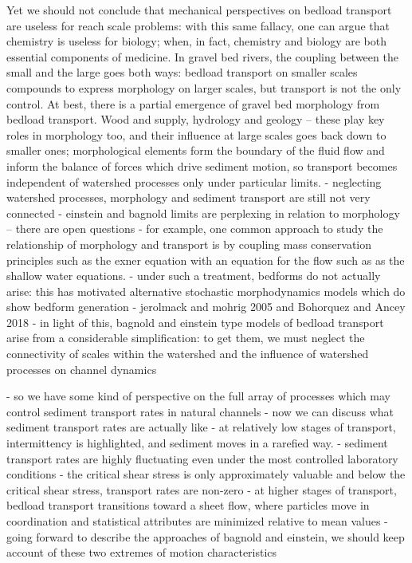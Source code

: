 \documentclass{article}
\begin{document}
{Yet we should not conclude that mechanical perspectives on bedload transport are useless for reach scale problems: with this same fallacy, one can argue that chemistry is useless for biology; when, in fact, chemistry and biology are both essential components of medicine. 
In gravel bed rivers, the coupling between the small and the large goes both ways: bedload transport on smaller scales compounds to express morphology on larger scales, but transport is not the only control. 
At best, there is a partial emergence of gravel bed morphology from bedload transport. 
Wood and supply, hydrology and geology -- these play key roles in morphology too, and their influence at large scales goes back down to smaller ones; morphological elements form the boundary of the fluid flow and inform the balance of forces which drive sediment motion, so transport becomes independent of watershed processes only under particular limits. 
- neglecting watershed processes, morphology and sediment transport are still not very connected 
- einstein and bagnold limits are perplexing in relation to morphology -- there are open questions
- for example, one common approach to study the relationship of morphology and transport is by coupling mass conservation principles such as the exner equation with an equation for the flow such as as the shallow water equations. 
- under such a treatment, bedforms do not actually arise: this has motivated alternative stochastic morphodynamics models which do show bedform generation 
- jerolmack and mohrig 2005 and Bohorquez and Ancey 2018
- in light of this, bagnold and einstein type models of bedload transport arise from a considerable simplification: to get them, we must neglect the connectivity of scales within the watershed and the influence of watershed processes on channel dynamics

- so we have some kind of perspective on the full array of processes which may control sediment transport rates in natural channels 
- now we can discuss what sediment transport rates are actually like 
- at relatively low stages of transport, intermittency is highlighted, and sediment moves in a rarefied way. 
- sediment transport rates are highly fluctuating even under the most controlled laboratory conditions
- the critical shear stress is only approximately valuable and below the critical shear stress, transport rates are non-zero 
- at higher stages of transport, bedload transport transitions toward a sheet flow, where particles move in coordination and statistical attributes are minimized relative to mean values
- going forward to describe the approaches of bagnold and einstein, we should keep account of these two extremes of motion characteristics 

}
\end{document}
